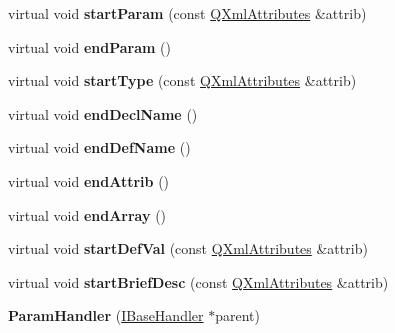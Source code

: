 \begin{DoxyCompactItemize}
\item 
\mbox{\label{class_param_handler_a28c5affc781dfe5d43fe488f352bec45}} 
virtual void {\bfseries start\+Param} (const \mbox{\hyperlink{class_q_xml_attributes}{Q\+Xml\+Attributes}} \&attrib)
\item 
\mbox{\label{class_param_handler_a8270c8313e33ca775ad25487deefda04}} 
virtual void {\bfseries end\+Param} ()
\item 
\mbox{\label{class_param_handler_a715809c54ff697acbf3a95fbc863dfcd}} 
virtual void {\bfseries start\+Type} (const \mbox{\hyperlink{class_q_xml_attributes}{Q\+Xml\+Attributes}} \&attrib)
\item 
\mbox{\label{class_param_handler_aa5b8170b1c24489f40717647311245c6}} 
virtual void {\bfseries end\+Decl\+Name} ()
\item 
\mbox{\label{class_param_handler_a46f9f6a05c9c4334dae2b0f27fa5cda5}} 
virtual void {\bfseries end\+Def\+Name} ()
\item 
\mbox{\label{class_param_handler_ad60c870e6d05e978d68d0abe7107fb66}} 
virtual void {\bfseries end\+Attrib} ()
\item 
\mbox{\label{class_param_handler_adaec8cb8d80e5637b16518f7c8a457a5}} 
virtual void {\bfseries end\+Array} ()
\item 
\mbox{\label{class_param_handler_a08411dc6c5c69cee3c40139528db7d7a}} 
virtual void {\bfseries start\+Def\+Val} (const \mbox{\hyperlink{class_q_xml_attributes}{Q\+Xml\+Attributes}} \&attrib)
\item 
\mbox{\label{class_param_handler_a90e1d8d302c14ffaf16660c8bc315d32}} 
virtual void {\bfseries start\+Brief\+Desc} (const \mbox{\hyperlink{class_q_xml_attributes}{Q\+Xml\+Attributes}} \&attrib)
\item 
\mbox{\label{class_param_handler_a97e9b8f9eb59ad8fd65589a481aa98c9}} 
{\bfseries Param\+Handler} (\mbox{\hyperlink{class_i_base_handler}{I\+Base\+Handler}} $\ast$parent)

\end{DoxyCompactItemize}
